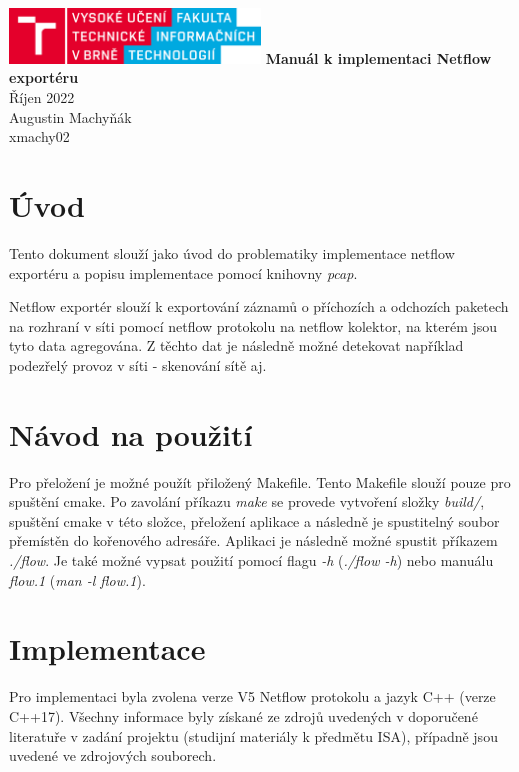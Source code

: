 \documentclass{article}
\begin{document}
\begin{titlepage}
    \centering
    \vfill
    \includegraphics[width=0.5\textwidth]{fit_logo}
    \vfill
    {\Huge{\bfseries{Manuál k implementaci Netflow exportéru}}\\
        \vspace*{1em}
        \Large{Říjen 2022}\\
        \vfill
        Augustin Machyňák \\
        xmachy02
    }
    \vfill
\end{titlepage}

\newpage

\tableofcontents
\newpage

\section{Úvod}
Tento dokument slouží jako úvod do problematiky implementace netflow exportéru
a popisu implementace pomocí knihovny \textit{pcap}.

Netflow exportér slouží k exportování záznamů o příchozích a odchozích paketech
na rozhraní v síti pomocí netflow protokolu na netflow kolektor, na kterém jsou tyto
data agregována.
Z těchto dat je následně možné detekovat například podezřelý provoz v síti - skenování sítě aj.

\section{Návod na použití}
Pro přeložení je možné použít přiložený Makefile. Tento Makefile slouží pouze
pro spuštění cmake. Po zavolání příkazu \textit{make} se provede vytvoření složky
\textit{build/}, spuštění cmake v této složce, přeložení aplikace a následně je
spustitelný soubor přemístěn do kořenového adresáře.
Aplikaci je následně možné spustit příkazem \textit{./flow}.
Je také možné vypsat použití pomocí flagu \textit{-h} (\textit{./flow -h})
nebo manuálu \textit{flow.1} (\textit{man -l flow.1}).

\section{Implementace}
Pro implementaci byla zvolena verze V5 Netflow protokolu a jazyk C++ (verze C++17).
Všechny informace byly získané ze zdrojů uvedených v doporučené literatuře v zadání
projektu (studijní materiály k předmětu ISA), případně jsou uvedené ve zdrojových souborech.
\end{document}
